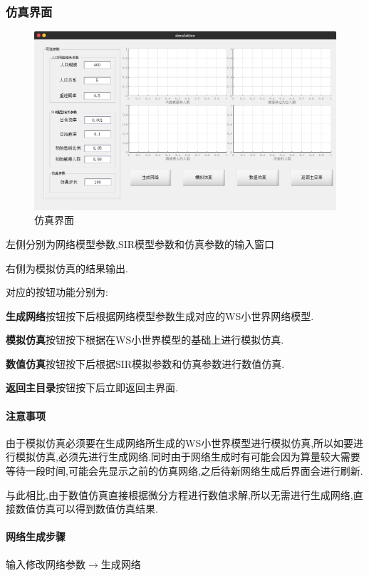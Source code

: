 \documentclass[supercite]{HustGraduPaper}
\begin{document}
	\subsubsection{仿真界面}
	\begin{figure}[H]
		\centering
		\includegraphics[scale=0.3]{Figures/simu.png}
		\caption{仿真界面}
	\end{figure} 
	左侧分别为网络模型参数,SIR模型参数和仿真参数的输入窗口 \par
	右侧为模拟仿真的结果输出. \par
	对应的按钮功能分别为: \par
	\textbf{生成网络}按钮按下后根据网络模型参数生成对应的WS小世界网络模型.\par
	\textbf{模拟仿真}按钮按下根据在WS小世界模型的基础上进行模拟仿真.\par
	\textbf{数值仿真}按钮按下后根据SIR模拟参数和仿真参数进行数值仿真.\par
	\textbf{返回主目录}按钮按下后立即返回主界面.\par

	\paragraph{注意事项}由于模拟仿真必须要在生成网络所生成的WS小世界模型进行模拟仿真,所以如要进行模拟仿真,必须先进行生成网络.同时由于网络生成时有可能会因为算量较大需要等待一段时间,可能会先显示之前的仿真网络,之后待新网络生成后界面会进行刷新.\par
	与此相比,由于数值仿真直接根据微分方程进行数值求解,所以无需进行生成网络,直接数值仿真可以得到数值仿真结果.


	\paragraph{网络生成步骤}
	输入修改网络参数$\to$生成网络
\end{document}

